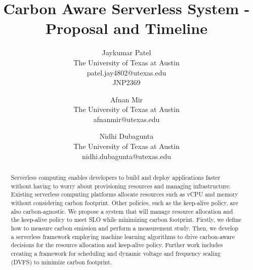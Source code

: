 \documentclass[times, 10pt]{article}
\begin{document}
\title{Carbon Aware Serverless System - Proposal and Timeline}

\author{Jaykumar Patel\\
The University of Texas at Austin\\
patel.jay4802@utexas.edu\\
JNP2369 \\
\and
Afnan Mir\\
The University of Texas at Austin\\
afnanmir@utexas.edu\\
\and
Nidhi Dubagunta\\
The University of Texas at Austin\\
nidhi.dubagunta@utexas.edu
}



\maketitle
\thispagestyle{empty}

\begin{abstract}
   Serverless computing enables developers to build and deploy applications faster without having to worry about provisioning resources and managing infrastructure. Existing serverless computing platforms allocate resources such as vCPU and memory without considering carbon footprint. Other policies, such as the keep-alive policy, are also carbon-agnostic. We propose a system that will manage resource allocation and the keep-alive policy to meet SLO while minimizing carbon footprint. Firstly, we define how to measure carbon emission and perform a measurement study. Then, we develop a serverless framework employing machine learning algorithms to drive carbon-aware decisions for the resource allocation and keep-alive policy. Further work includes creating a framework for scheduling and dynamic voltage and frequency scaling (DVFS) to minimize carbon footprint.
\end{abstract}
\end{document}
